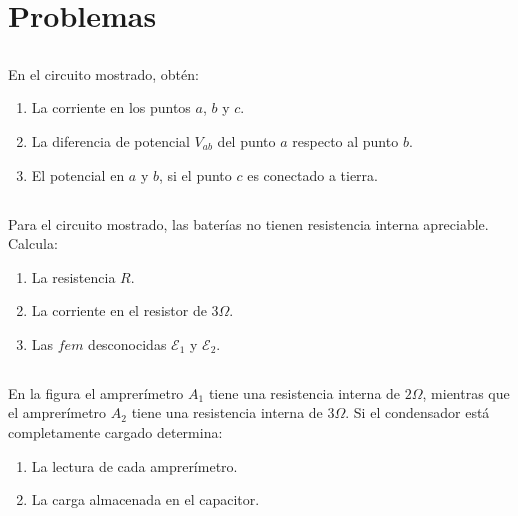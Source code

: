 \documentclass[../main.tex]{subfiles}
\begin{document}
\section{Problemas}%
\label{sec:problemas}

\thispagestyle{fancy}

\setcounter{subsection}{1}

\subsection{}%

En el circuito mostrado, obtén:

\begin{enumerate}[label=\alph*.]
	\item La corriente en los puntos $a$, $b$ y $c$.
	\item La diferencia de potencial $V_{ab}$ del punto $a$ respecto al
		punto $b$.
	\item El potencial en $a$ y $b$, si el punto $c$ es conectado a tierra.
\end{enumerate}

\setcounter{subsection}{4}

\subsection{}%

Para el circuito mostrado, las baterías no tienen resistencia interna
apreciable. Calcula:

\begin{enumerate}[label=\alph*.]
	\item La resistencia $R$.
	\item La corriente en el resistor de $3\Omega$.
	\item Las $fem$ desconocidas $\mathcal{E}_1$ y $\mathcal{E}_2$.
\end{enumerate}

\setcounter{subsection}{10}

\subsection{}%

En la figura el amprerímetro $A_1$ tiene una resistencia interna de $2\Omega$,
mientras que el amprerímetro $A_2$ tiene una resistencia interna de $3\Omega$.
Si el condensador está completamente cargado determina:

\begin{enumerate}[label=\alph*.]
	\item La lectura de cada amprerímetro.
	\item La carga almacenada en el capacitor.
\end{enumerate}
\end{document}
